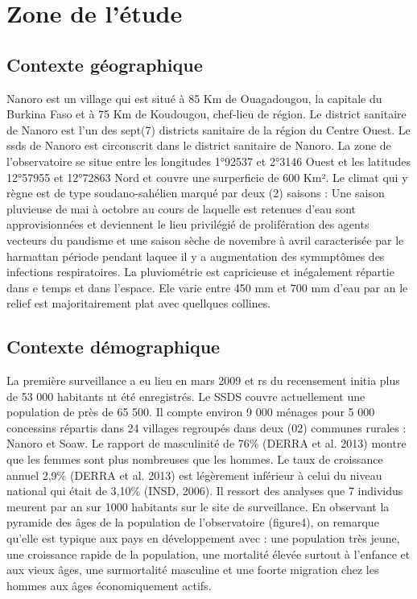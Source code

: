 \documentclass[12pt]{report}
\begin{document}
		\section{Zone de l'étude}
			\subsection{Contexte géographique}
			
			Nanoro est un village qui est situé à 85 Km de Ouagadougou, la capitale du Burkina Faso et à 75 Km de Koudougou, chef-lieu de région. Le district sanitaire de Nanoro est l'un des sept(7) districts sanitaire de la région du Centre Ouest. Le \gls{ssds} de Nanoro est circonscrit dans le district sanitaire de Nanoro. La zone de l'observatoire se situe entre les longitudes 1°92537 et 2°3146 Ouest et les latitudes 12°57955 et 12°72863 Nord et couvre une surperficie de 600 Km². Le climat qui y règne est de type soudano-sahélien marqué par deux (2) saisons : Une saison pluvieuse de mai à octobre au cours de laquelle est retenues d'eau sont approvisionnées et deviennent le lieu privilégié de prolifération des agents vecteurs du paudisme et une saison sèche de novembre à avril caracterisée par le harmattan période pendant laquee il y a augmentation des symmptômes des infections respiratoires. La pluviométrie est capricieuse et inégalement répartie dans e temps et dans l'espace. Ele varie entre 450 mm et 700 mm d'eau par an le relief est majoritairement plat avec quellques collines.
			
			\subsection{Contexte démographique}
			
			La première surveillance a eu lieu en mars 2009 et rs du recensement initia plus de 53 000 habitants nt été enregistrés. Le SSDS couvre actuellement une population de près de 65 500. Il compte environ 9 000 ménages pour 5 000 concessins répartis dans 24 villages regroupés dans deux (02) communes rurales : Nanoro et Soaw. Le rapport de masculinité de 76\% (DERRA et al. 2013) montre que les femmes sont plus nombreuses que les hommes. Le taux de croissance annuel 2,9\% (DERRA et al. 2013) est légèrement inférieur à celui du niveau national qui était de 3,10\% (INSD, 2006). Il ressort des analyses que 7 individus meurent par an sur 1000 habitants sur le site de surveillance. En observant la pyramide des âges de la population de l'observatoire (figure4), on remarque qu'elle est typique aux pays en développement avec : une population très jeune, une croissance rapide de la population, une mortalité élevée surtout à l'enfance et aux vieux âges, une surmortalité masculine et une foorte migration chez les hommes aux âges économiquement actifs.
			
\end{document}
